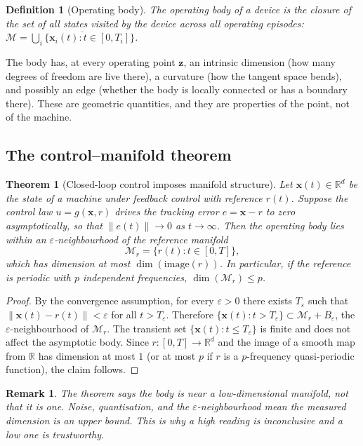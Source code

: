 \documentclass[11pt]{article}
\newtheorem{theorem}{Theorem}
\newtheorem{definition}{Definition}
\newtheorem{remark}{Remark}
\newcommand{\R}{\mathbb{R}}
\newcommand{\x}{\bm{x}}
\newcommand{\z}{\bm{z}}
\newcommand{\bdy}{\mathcal{M}}
\begin{document}
\begin{definition}[Operating body]
The operating body of a device is the closure of the set of all states visited
by the device across all operating episodes:
$\bdy = \overline{\bigcup_i \{\x_i(t) : t \in [0, T_i]\}}$.
\end{definition}

The body has, at every operating point $\z$, an intrinsic dimension (how many
degrees of freedom are live there), a curvature (how the tangent space bends),
and possibly an edge (whether the body is locally connected or has a boundary
there). These are geometric quantities, and they are properties of the point,
not of the machine.

\subsection{The control--manifold theorem}

\begin{theorem}[Closed-loop control imposes manifold structure]
\label{thm:control}
Let $\x(t) \in \R^d$ be the state of a machine under feedback control with
reference $r(t)$. Suppose the control law $u = g(\x, r)$ drives the tracking
error $e = \x - r$ to zero asymptotically, so that $\|e(t)\| \to 0$ as
$t \to \infty$. Then the operating body lies within an
$\varepsilon$-neighbourhood of the reference manifold
\[
  \bdy_r = \{r(t) : t \in [0, T]\},
\]
which has dimension at most $\dim(\mathrm{image}(r))$. In particular, if the
reference is periodic with $p$ independent frequencies, $\dim(\bdy_r) \le p$.
\end{theorem}

\begin{proof}
By the convergence assumption, for every $\varepsilon > 0$ there exists
$T_\varepsilon$ such that $\|\x(t) - r(t)\| < \varepsilon$ for all
$t > T_\varepsilon$. Therefore
$\{\x(t) : t > T_\varepsilon\} \subset \bdy_r + B_\varepsilon$, the
$\varepsilon$-neighbourhood of $\bdy_r$. The transient set
$\{\x(t) : t \le T_\varepsilon\}$ is finite and does not affect the
asymptotic body. Since $r: [0,T] \to \R^d$ and the image of a smooth map from
$\R$ has dimension at most $1$ (or at most $p$ if $r$ is a $p$-frequency
quasi-periodic function), the claim follows.
\end{proof}

\begin{remark}
The theorem says the body is \emph{near} a low-dimensional manifold, not that
it \emph{is} one. Noise, quantisation, and the $\varepsilon$-neighbourhood
mean the measured dimension is an upper bound. This is why a high reading is
inconclusive and a low one is trustworthy.
\end{remark}
\end{document}
